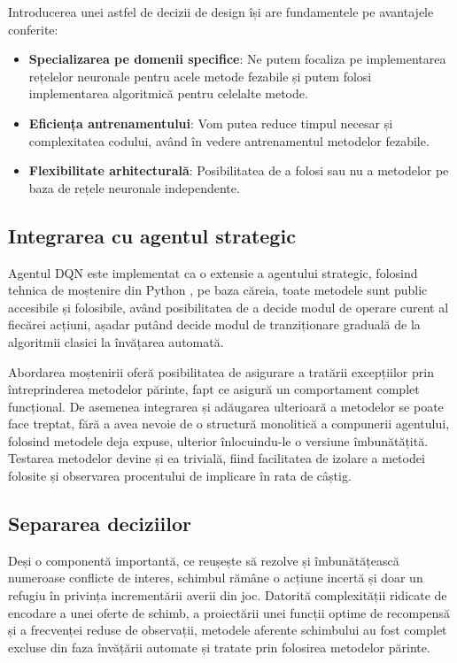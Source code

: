 Introducerea unei astfel de decizii de design își are fundamentele pe avantajele conferite:
\begin{itemize}
    \item \textbf{Specializarea pe domenii specifice}: Ne putem focaliza pe implementarea rețelelor neuronale pentru acele metode fezabile și putem folosi implementarea algoritmică pentru celelalte metode.
    \item \textbf{Eficiența antrenamentului}: Vom putea reduce timpul necesar și complexitatea codului, având în vedere antrenamentul metodelor fezabile.
    \item \textbf{Flexibilitate arhitecturală}: Posibilitatea de a folosi sau nu a metodelor pe baza de rețele neuronale independente.
\end{itemize}

\subsection{Integrarea cu agentul strategic}
Agentul DQN este implementat ca o extensie a agentului strategic, folosind tehnica de moștenire din Python \cite{python_inheritance}, pe baza căreia, toate metodele sunt public accesibile și folosibile, având posibilitatea de a decide modul de operare curent al fiecărei acțiuni, așadar putând decide modul de tranziționare graduală de la algoritmii clasici la învățarea automată.

Abordarea moștenirii oferă posibilitatea de asigurare a tratării excepțiilor prin întreprinderea metodelor părinte, fapt ce asigură un comportament complet funcțional. De asemenea integrarea și adăugarea ulterioară a metodelor se poate face treptat, fără a avea nevoie de o structură monolitică a compunerii agentului, folosind metodele deja expuse, ulterior înlocuindu-le o versiune îmbunătățită. Testarea metodelor devine și ea trivială, fiind facilitatea de izolare a metodei folosite și observarea procentului de implicare în rata de câștig.

\subsection{Separarea deciziilor}
Deși o componentă importantă, ce reușește să rezolve și îmbunătățească numeroase conflicte de interes, schimbul rămâne o acțiune incertă și doar un refugiu în privința incrementării averii din joc. Datorită complexității ridicate de encodare a unei oferte de schimb, a proiectării unei funcții optime de recompensă și a frecvenței reduse de observații, metodele aferente schimbului au fost complet excluse din faza învățării automate și tratate prin folosirea metodelor părinte.

